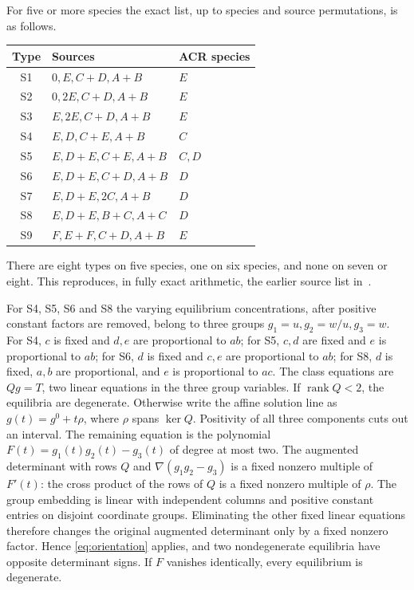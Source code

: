 \documentclass[11pt,a4paper]{report}
\providecommand{\rank}{\operatorname{rank}}
\begin{document}
For five or more species the exact list, up to species and source permutations, is as follows.
\begin{center}
\begin{tabular}{cll}
\toprule
Type & Sources & ACR species\\
\midrule
S1 & $0,E,C+D,A+B$ & $E$\\
S2 & $0,2E,C+D,A+B$ & $E$\\
S3 & $E,2E,C+D,A+B$ & $E$\\
S4 & $E,D,C+E,A+B$ & $C$\\
S5 & $E,D+E,C+E,A+B$ & $C,D$\\
S6 & $E,D+E,C+D,A+B$ & $D$\\
S7 & $E,D+E,2C,A+B$ & $D$\\
S8 & $E,D+E,B+C,A+C$ & $D$\\
S9 & $F,E+F,C+D,A+B$ & $E$\\
\bottomrule
\end{tabular}
\end{center}
There are eight types on five species, one on six species, and none on seven or eight.
This reproduces, in fully exact arithmetic, the earlier source list in~\autocite{Prior2026}.

For S4, S5, S6 and S8 the varying equilibrium concentrations, after positive constant factors are
removed, belong to three groups $g_1=u,g_2=w/u,g_3=w$. For S4, $c$ is fixed and $d,e$ are
proportional to $ab$; for S5, $c,d$ are fixed and $e$ is proportional to $ab$; for S6, $d$ is fixed
and $c,e$ are proportional to $ab$; for S8, $d$ is fixed, $a,b$ are proportional, and $e$ is
proportional to $ac$. The class equations are $Qg=T$, two linear equations in the three group
variables. If $\rank Q<2$, the equilibria are degenerate. Otherwise write the affine solution line
as $g(t)=g^0+t\rho$, where $\rho$ spans $\ker Q$. Positivity of all three components cuts out an
interval. The remaining equation is the polynomial $F(t)=g_1(t)g_2(t)-g_3(t)$ of degree at most two.
The augmented determinant with rows $Q$ and $\nabla(g_1g_2-g_3)$ is a fixed nonzero multiple of
$F'(t)$: the cross product of the rows of $Q$ is a fixed nonzero multiple of $\rho$.
The group embedding is linear with independent columns and positive constant entries on disjoint
coordinate groups. Eliminating the other fixed linear equations therefore changes the original
augmented determinant only by a fixed nonzero factor. Hence \eqref{eq:orientation} applies, and
two nondegenerate equilibria have opposite determinant signs. If $F$ vanishes identically, every
equilibrium is degenerate.
\end{document}
